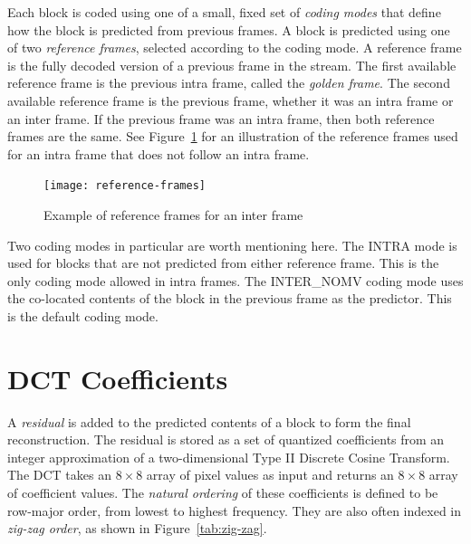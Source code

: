 \documentclass[9pt,letterpaper]{book}
\newcommand{\term}[1]{{\em #1}}
\numberwithin{equation}{chapter}
\numberwithin{figure}{chapter}
\numberwithin{table}{chapter}
\begin{document}
Each block is coded using one of a small, fixed set of \term{coding modes} that
 define how the block is predicted from previous frames.
A block is predicted using one of two \term{reference frames}, selected
 according to the coding mode.
A reference frame is the fully decoded version of a previous frame in the
 stream.
The first available reference frame is the previous intra frame, called the
 \term{golden frame}.
The second available reference frame is the previous frame, whether it was an
 intra frame or an inter frame.
If the previous frame was an intra frame, then both reference frames are the
 same.
See Figure~\ref{fig:reference-frames} for an illustration of the reference
 frames used for an intra frame that does not follow an intra frame.

\begin{figure}[htbp]
\begin{center}
\texttt{[image: reference-frames]}
\end{center}
\caption{Example of reference frames for an inter frame}
\label{fig:reference-frames}
\end{figure}

Two coding modes in particular are worth mentioning here.
The INTRA mode is used for blocks that are not predicted from either reference
 frame.
This is the only coding mode allowed in intra frames.
The INTER\_NOMV coding mode uses the co-located contents of the block in the
 previous frame as the predictor.
This is the default coding mode.

\section{DCT Coefficients}
\label{sec:dct-coeffs}

A \term{residual} is added to the predicted contents of a block to form the
 final reconstruction.
The residual is stored as a set of quantized coefficients from an integer
 approximation of a two-dimensional Type II Discrete Cosine Transform.
The DCT takes an $8\times 8$ array of pixel values as input and returns an
 $8\times 8$ array of coefficient values.
The \term{natural ordering} of these coefficients is defined to be row-major
 order, from lowest to highest frequency.
They are also often indexed in \term{zig-zag order}, as shown in
 Figure~\ref{tab:zig-zag}.
\end{document}
